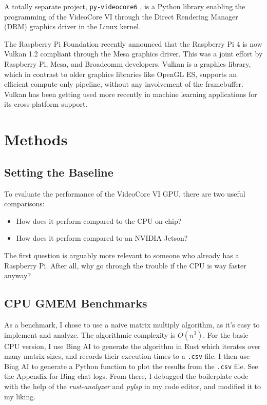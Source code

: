 \documentclass[12pt]{article}
\begin{document}
A totally separate project, \verb|py-videocore6| \cite{pyvideocore6}, is a Python library enabling the programming of the VideoCore VI through the Direct Rendering Manager (DRM) graphics driver in the Linux kernel.

The Raspberry Pi Foundation recently announced that the Raspberry Pi 4 is now Vulkan 1.2 compliant through the Mesa graphics driver. This was a joint effort by Raspberry Pi, Mesa, and Broadcomm developers. Vulkan is a graphics library, which in contrast to older graphics libraries like OpenGL ES, supports an efficient compute-only pipeline, without any involvement of the framebuffer. Vulkan has been getting used more recently in machine learning applications for its cross-platform support. 

\section{Methods}\label{sec:methods}
\subsection{Setting the Baseline}
To evaluate the performance of the VideoCore VI GPU, there are two useful comparisons: 

\begin{itemize}
\item How does it perform compared to the CPU on-chip?
\item How does it perform compared to an NVIDIA Jetson?
\end{itemize}

The first question is arguably more relevant to someone who already has a Raspberry Pi. After all, why go through the trouble if the CPU is way faster anyway? 

\subsection{CPU GMEM Benchmarks}

As a benchmark, I chose to use a naive matrix multiply algorithm, as it's easy to implement and analyze. The algorithmic complexity is $O(n^3)$. For the basic CPU version, I use Bing AI to generate the algorithm in Rust which iterates over many matrix sizes, and records their execution times to a \verb|.csv| file. I then use Bing AI to generate a Python function to plot the results from the \verb|.csv| file. See the Appendix for Bing chat logs. From there, I debugged the boilerplate code with the help of the \textit{rust-analyzer} and \textit{pylsp} in my code editor, and modified it to my liking.
\end{document}
